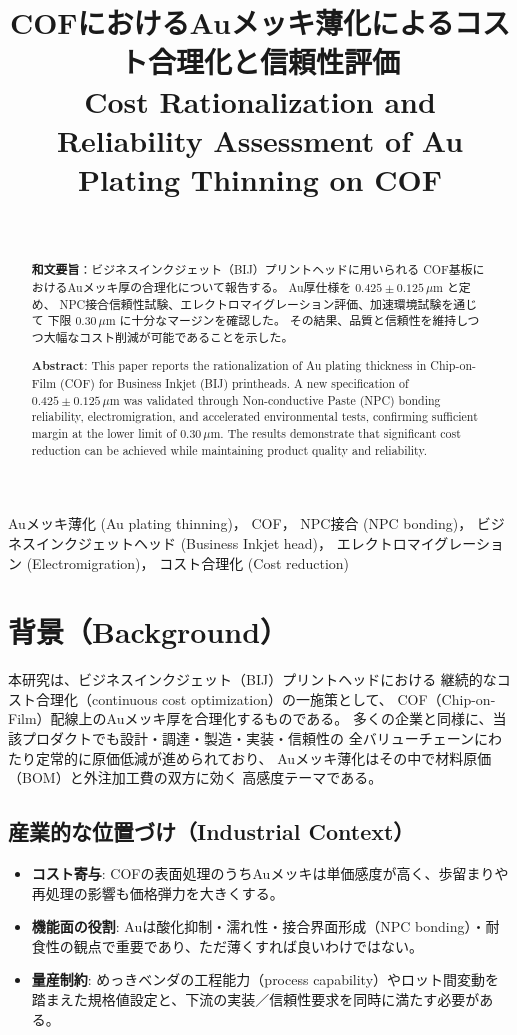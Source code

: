 \documentclass[onecolumn]{IEEEtran} %
\title{COFにおけるAuメッキ薄化によるコスト合理化と信頼性評価\\
\large Cost Rationalization and Reliability Assessment of Au Plating Thinning on COF}
\author{%
  \IEEEauthorblockN{三溝 真一（Shinichi Samizo)}\\
  \IEEEauthorblockA{独立系半導体研究者（元セイコーエプソン）\\
  Email: \href{mailto:shin3t72@gmail.com}{shin3t72@gmail.com}\\
  GitHub: \url{https://github.com/Samizo-AITL}}%
}
\begin{document}
\maketitle

\begin{abstract}
\textbf{和文要旨}：ビジネスインクジェット（BIJ）プリントヘッドに用いられる
COF基板におけるAuメッキ厚の合理化について報告する。
Au厚仕様を $0.425 \pm 0.125\,\mu$m と定め、
NPC接合信頼性試験、エレクトロマイグレーション評価、加速環境試験を通じて
下限 $0.30\,\mu$m に十分なマージンを確認した。
その結果、品質と信頼性を維持しつつ大幅なコスト削減が可能であることを示した。

\medskip
\textbf{Abstract}: This paper reports the rationalization of Au plating thickness
in Chip-on-Film (COF) for Business Inkjet (BIJ) printheads.
A new specification of $0.425 \pm 0.125\,\mu$m was validated
through Non-conductive Paste (NPC) bonding reliability, electromigration,
and accelerated environmental tests, confirming sufficient margin at the lower limit of $0.30\,\mu$m.
The results demonstrate that significant cost reduction can be achieved
while maintaining product quality and reliability.
\end{abstract}

\begin{IEEEkeywords}
Auメッキ薄化 (Au plating thinning)，
COF，
NPC接合 (NPC bonding)，
ビジネスインクジェットヘッド (Business Inkjet head)，
エレクトロマイグレーション (Electromigration)，
コスト合理化 (Cost reduction)
\end{IEEEkeywords}

\section{背景（Background）}
本研究は、ビジネスインクジェット（BIJ）プリントヘッドにおける
継続的なコスト合理化（continuous cost optimization）の一施策として、
COF（Chip-on-Film）配線上のAuメッキ厚を合理化するものである。
多くの企業と同様に、当該プロダクトでも設計・調達・製造・実装・信頼性の
全バリューチェーンにわたり定常的に原価低減が進められており、
Auメッキ薄化はその中で材料原価（BOM）と外注加工費の双方に効く
高感度テーマである。

\subsection*{産業的な位置づけ（Industrial Context）}
\begin{itemize}
  \item \textbf{コスト寄与}: COFの表面処理のうちAuメッキは単価感度が高く、歩留まりや再処理の影響も価格弾力を大きくする。
  \item \textbf{機能面の役割}: Auは酸化抑制・濡れ性・接合界面形成（NPC bonding）・耐食性の観点で重要であり、ただ薄くすれば良いわけではない。
  \item \textbf{量産制約}: めっきベンダの工程能力（process capability）やロット間変動を踏まえた規格値設定と、下流の実装／信頼性要求を同時に満たす必要がある。
\end{itemize}
\end{document}
